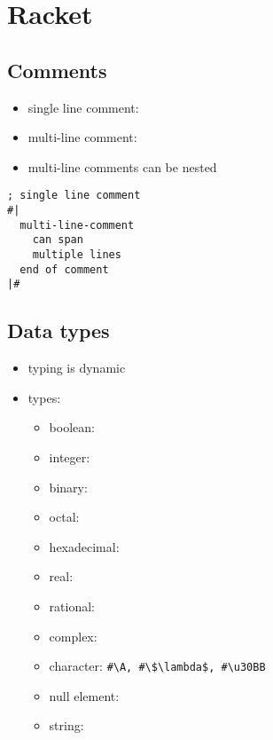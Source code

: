 \documentclass[a4paper,landscape,10pt]{article}
\begin{document}
\section{Racket}
\begin{multicols*}{2}
  \subsection{Comments}

  \begin{itemize}
    \item single line comment: \iracket{;}
    \item multi-line comment: 
    \item multi-line comments can be nested
  \end{itemize}

  \begin{lstlisting}[language=Racket]
; single line comment
#|
  multi-line-comment
	can span
	multiple lines
  end of comment
|#
\end{lstlisting}

  \subsection{Data types}

  \begin{itemize}
    \item typing is dynamic
    \item types:
          \begin{itemize}
            \item boolean: 
            \item integer: 
            \item binary: 
            \item octal: 
            \item hexadecimal: 
            \item real: 
            \item rational: 
            \item complex: 
            \item character: \lstinline[language=Racket]!#\A, #\$\lambda$, #\u30BB!
            \item null element: 
            \item string: 
          \end{itemize}
  \end{itemize}


\end{multicols*}
\end{document}
